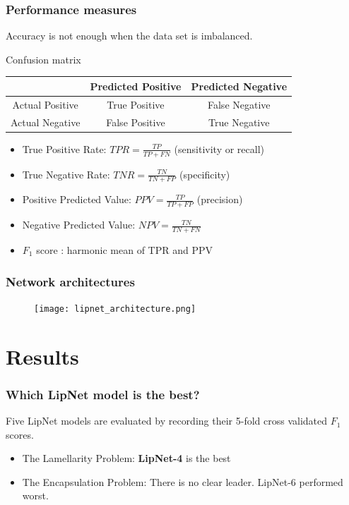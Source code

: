 \documentclass{beamer}
\begin{document}
%
%

\begin{frame}
\frametitle{Performance measures}

\begin{block}{}
Accuracy is not enough when the data set is imbalanced.
\end{block}

\begin{block}{Confusion matrix}
\begin{table}
\begin{tabular}{|c|c|c|}
\hline 
 & Predicted Positive & Predicted Negative \\ 
\hline 
Actual Positive & True Positive & False Negative \\ 
\hline 
Actual Negative & False Positive & True Negative \\ 
\hline 
\end{tabular} 
\end{table}
\end{block}

\begin{itemize}
\item True Positive Rate: $TPR = \frac{TP}{TP + FN}$ (sensitivity or recall)
\item True Negative Rate: $TNR = \frac{TN}{TN + FP}$ (specificity)
\item Positive Predicted Value: $PPV = \frac{TP}{TP + FP}$ (precision)
\item Negative Predicted Value: $NPV = \frac{TN}{TN + FN}$
\item $F_1$ score : harmonic mean of TPR and PPV
\end{itemize}
\end{frame}

%
%

\begin{frame}
\frametitle{Network architectures}

\begin{figure}
\centering
\texttt{[image: lipnet\_architecture.png]} 
\end{figure}

\end{frame}

\section{Results}
\begin{frame}
\frametitle{Which LipNet model is the best?}
Five LipNet models are evaluated by recording their 5-fold cross validated $F_1$ scores. 
\vskip 0.2in
\begin{itemize}
\item<2-> The Lamellarity Problem: \textbf{LipNet-4} is the best
\item<3-> The Encapsulation Problem: There is no clear leader. LipNet-6 performed worst. 
\end{itemize}
\end{frame}
\end{document}
